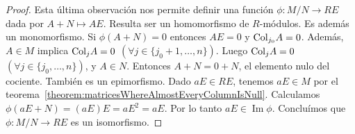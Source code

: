 \documentclass{report}
\newcommand{\Col}{\textnormal{Col}}
\DeclareMathOperator{\image}{\text{Im}}
\begin{document}
\begin{proof}
    Esta última observación nos permite definir una función \(\phi : M / N \rightarrow R E\) dada por \(A + N \mapsto A E\).
    Resulta ser un homomorfismo de \(R\)-módulos.
    Es además un monomorfismo.
    Si \(\phi(A + N) = 0\) entonces \(A E = 0\) y \(\Col_{j_0} A = 0\).
    Además, \(A \in M\) implica \(\Col_j A = 0\) \((\forall j \in \{j_0 + 1, \dots, n\})\).
    Luego \(\Col_j A = 0\) \((\forall j \in \{j_0, \dots, n\})\), y \(A \in N\).
    Entonces \(A + N = 0 + N\), el elemento nulo del cociente.
    También es un epimorfismo.
    Dado \(a E \in R E\), tenemos \(a E \in M\) por el teorema~\ref{theorem:matricesWhereAlmostEveryColumnIsNull}.
    Calculamos \(\phi(a E + N)= (a E) E = a E^2 = a E\).
    Por lo tanto \(a E \in \image \phi\).
    Concluímos que \(\phi : M / N \rightarrow R E\) es un isomorfismo.
  \end{proof}
\end{document}
